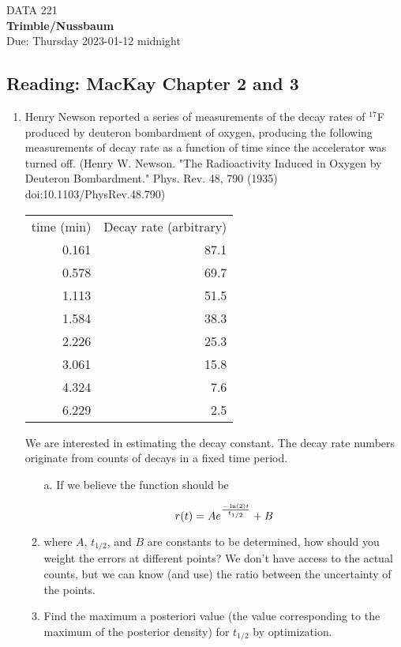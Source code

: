 \documentclass[12pt]{book}
\theoremstyle{definition}
\begin{document}
\begin{center}
{\Large DATA 221   }\\
\textbf{Trimble/Nussbaum}\\ %
Due: Thursday 2023-01-12  midnight
\end{center}

\vspace{0.2 cm}

\subsection*{Reading:  MacKay Chapter 2 and 3}

\begin{enumerate}
\item  Henry Newson reported a series of measurements of the decay rates of $^{17}$F produced by deuteron bombardment of oxygen, producing the following measurements of decay rate as a function of time since the accelerator was turned off. (Henry W. Newson.  "The Radioactivity Induced in Oxygen by Deuteron Bombardment." Phys. Rev. 48, 790 (1935) doi:10.1103/PhysRev.48.790)

\begin{tabular}{rr} \\
time (min) &    Decay rate (arbitrary) \\
0.161 & 87.1 \\
0.578 & 69.7 \\
1.113 & 51.5 \\
1.584 & 38.3 \\
2.226 & 25.3 \\
3.061 & 15.8 \\
4.324 & 7.6 \\
6.229 & 2.5 \\
\end{tabular}

We are interested in estimating the decay constant.  The decay rate numbers originate from counts of decays in a fixed time period.

 \begin{enumerate}[label=\alph*)]
  \item[a.] If we believe the function should be 
 
$$ r(t) = A e ^{ - \ln (2) t \over t_{1/2} } + B $$

  \item  where $A$, $t_{1/2}$, and $B$ are constants to be determined, how should you weight the errors at different points?  We don't have access to the actual counts, but we can know (and use) the ratio between the uncertainty of the points.
  \item  Find the maximum a posteriori value (the value corresponding to the  maximum of the posterior density) for $t_{1/2} $ by optimization.
 \end{enumerate}


\end{enumerate}
\end{document}
